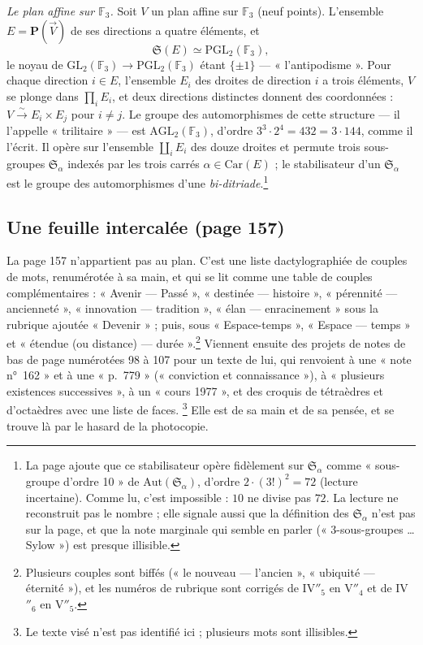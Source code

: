 \documentclass[11pt,a4paper]{article}
\begin{document}
\emph{Le plan affine sur $\mathbb{F}_3$.} Soit $V$ un plan affine sur
$\mathbb{F}_3$ (neuf points). L'ensemble $E = \mathbf{P}(\vec V)$ de ses
directions a quatre éléments, et
\[
  \mathfrak{S}(E) \simeq \mathrm{PGL}_2(\mathbb{F}_3),
\]
le noyau de $\mathrm{GL}_2(\mathbb{F}_3) \to \mathrm{PGL}_2(\mathbb{F}_3)$
étant $\{\pm 1\}$ — « l'antipodisme ». Pour chaque direction $i \in E$,
l'ensemble $E_i$ des droites de direction $i$ a trois éléments, $V$ se plonge
dans $\prod_i E_i$, et deux directions distinctes donnent des coordonnées :
$V \xrightarrow{\sim} E_i \times E_j$ pour $i \neq j$. Le groupe des
automorphismes de cette structure — il l'appelle « trilitaire » — est
$\mathrm{AGL}_2(\mathbb{F}_3)$, d'ordre $3^3 \cdot 2^4 = 432 = 3 \cdot 144$,
comme il l'écrit. Il opère sur l'ensemble $\coprod_{i} E_i$ des douze droites
et permute trois sous-groupes $\mathfrak{S}_\alpha$ indexés par les trois
carrés $\alpha \in \mathrm{Car}(E)$ ; le stabilisateur d'un $\mathfrak{S}_\alpha$
est le groupe des automorphismes d'une \emph{bi-ditriade}.\footnote{La page
ajoute que ce stabilisateur opère fidèlement sur $\mathfrak{S}_\alpha$ comme
« sous-groupe d'ordre 10 » de $\mathrm{Aut}(\mathfrak{S}_\alpha)$, d'ordre
$2 \cdot (3!)^2 = 72$ (lecture incertaine). Comme lu, c'est impossible :
$10$ ne divise pas $72$. La lecture ne reconstruit pas le nombre ; elle
signale aussi que la définition des $\mathfrak{S}_\alpha$ n'est pas sur la
page, et que la note marginale qui semble en parler (« 3-sous-groupes
\ldots{} Sylow ») est presque illisible.}

\subsection*{Une feuille intercalée (page 157)}

La page 157 n'appartient pas au plan. C'est une liste dactylographiée de
couples de mots, renumérotée à sa main, et qui se lit comme une table de
couples complémentaires : « Avenir — Passé », « destinée — histoire »,
« pérennité — ancienneté », « innovation — tradition », « élan —
enracinement » sous la rubrique ajoutée « Devenir » ; puis, sous
« Espace-temps », « Espace — temps » et « étendue (ou distance) —
durée ».\footnote{Plusieurs couples sont biffés (« le nouveau — l'ancien »,
« ubiquité — éternité »), et les numéros de rubrique sont corrigés de
IV$''_5$ en V$''_4$ et de IV$''_6$ en V$''_5$.} Viennent ensuite des projets
de notes de bas de page numérotées 98 à 107 pour un texte de lui, qui
renvoient à une « note n°~162 » et à une « p.~779 » (« conviction et
connaissance »), à « plusieurs existences successives », à un « cours 1977 »,
et des croquis de tétraèdres et d'octaèdres avec une liste de faces.
\footnote{Le texte visé n'est pas identifié ici ; plusieurs mots sont
illisibles.} Elle est de sa main et de sa pensée, et se trouve là par le
hasard de la photocopie.
\end{document}
